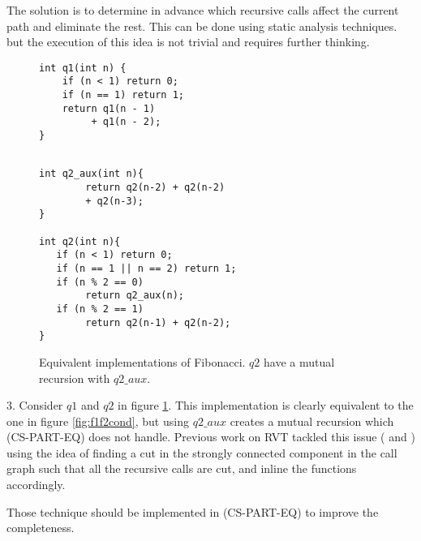 The solution is to determine in advance which recursive calls affect the current path and eliminate the rest. This can be done using static analysis techniques. but the execution of this idea is not trivial and requires further thinking.

\begin{figure}[h]
\begin{center}
\begin{minipage}{7 cm}
\begin{lstlisting}
int q1(int n) {
    if (n < 1) return 0;
    if (n == 1) return 1;
    return q1(n - 1) 
         + q1(n - 2);
}
\end{lstlisting}
\end{minipage}
\begin{minipage}{7 cm}
\begin{lstlisting}

int q2_aux(int n){
        return q2(n-2) + q2(n-2)
        + q2(n-3);
}

int q2(int n){
   if (n < 1) return 0;
   if (n == 1 || n == 2) return 1; 
   if (n % 2 == 0)
        return q2_aux(n);
   if (n % 2 == 1)
        return q2(n-1) + q2(n-2);
}
\end{lstlisting}
\end{minipage}
\caption{Equivalent implementations of Fibonacci. $q2$ have a mutual recursion with $q2\_aux$.}
\label{fig:mutualrecursion}
\end{center}
\end{figure}

3. Consider $q1$ and $q2$ in figure \ref{fig:mutualrecursion}. This implementation is clearly equivalent to the one in figure \ref{fig:f1f2cond}, but using $q2\_aux$ creates a mutual recursion which (CS-PART-EQ) does not handle. Previous work on RVT tackled this issue (\cite{DBLP:conf/dac/GodlinS09} and \cite{DBLP:conf/fm/StrichmanV16}) using the idea of finding a cut in the strongly connected component in the call graph such that all the recursive calls are cut, and inline the functions accordingly.

Those technique should be implemented in (CS-PART-EQ) to improve the completeness.




































